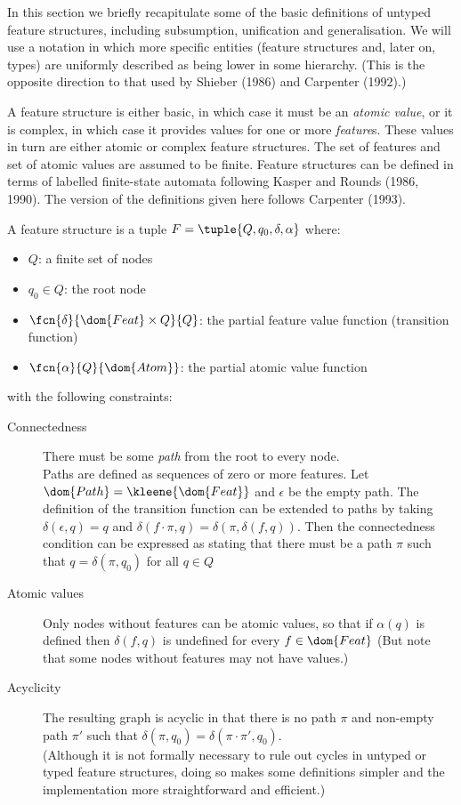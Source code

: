 \documentclass[12pt]{report}
\begin{document}
In this section we briefly recapitulate 
some of the basic definitions of untyped feature structures, including
subsumption, unification and generalisation.  
We will use a notation in which more specific entities
(feature structures and, later on, types) are uniformly described as
being lower in some hierarchy.  (This is the opposite direction
to that used by Shieber (1986) and Carpenter (1992).)

A feature structure is either basic, in which case it must
be an {\em atomic value}, or it is complex, in which case it
provides values for one or more {\em feature}s.  
These values in turn are either atomic or complex feature structures.
The set  of features and 
set  of atomic values are assumed to be finite.
Feature structures can be defined in terms of
labelled finite-state automata
following Kasper and Rounds (1986, 1990).  The version of the
definitions given here follows Carpenter (1993).    
%
\begin{definition}
A feature structure is a tuple $F =
\tuple{Q,q_{0},\delta,\alpha}$ where:
\begin{itemize}
\item
$Q$:  a finite set of nodes 
\item
$q_{0} \in Q$: the root node
\item
$\fcn{\delta}{\dom{Feat} \times Q}{Q}$:  
the partial feature value function (transition function)
\item
$\fcn{\alpha}{Q}{\dom{Atom}}$: the partial atomic value function
\end{itemize}
with the following constraints:
\begin{description}
\item [Connectedness] 
There must be some {\em path} from the root to every node.\\
Paths are defined as sequences of zero or more features.
Let $\dom{Path} = \kleene{\dom{Feat}}$ and $\epsilon$ be the empty path.  
The definition of the transition function can be extended to paths by taking
$\delta(\epsilon,q) = q$ and $\delta(f\cdot\pi, q) =
\delta(\pi,\delta(f,q))$.  Then the connectedness condition
can be expressed as stating that there must be a path 
$\pi$ such that $q = \delta(\pi,q_{0})$ for all $q \in Q$
\item [Atomic values]
Only nodes without features can be atomic values, so that if
$\alpha(q)$ is defined then $\delta(f,q)$ is undefined for every $f
\in \dom{Feat}$
{\rm (But note that some nodes without
features may not have values.)}
\item [Acyclicity] The resulting graph is acyclic in that
there is no path $\pi$ and non-empty path $\pi'$ such that
$\delta(\pi,q_{0}) = \delta(\pi \cdot \pi',q_{0})$. \\
{\rm (Although it is not formally 
necessary to rule out cycles in untyped or typed
feature structures, doing so makes some definitions 
simpler and the implementation more straightforward and efficient.)}
\end{description}
\end{definition}
\end{document}
